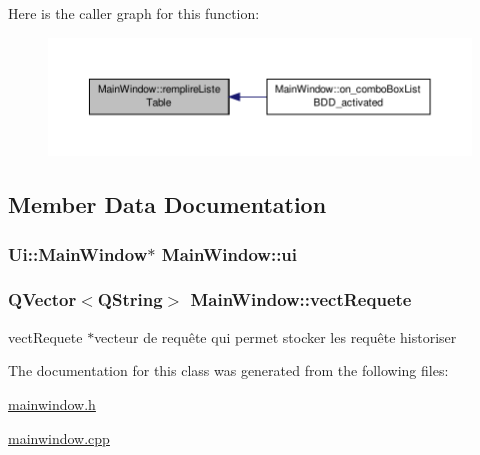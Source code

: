 Here is the caller graph for this function\-:\nopagebreak
\begin{figure}[H]
\begin{center}
\leavevmode
\includegraphics[width=350pt]{class_main_window_a1806a3496bae552b99a6c4e7e94c6b06_icgraph}
\end{center}
\end{figure}




\subsection{Member Data Documentation}
\hypertarget{class_main_window_a35466a70ed47252a0191168126a352a5}{
\subsubsection[{ui}]{\setlength{\rightskip}{0pt plus 5cm}Ui\-::\-Main\-Window$\ast$ Main\-Window\-::ui\hspace{0.3cm}{\ttfamily [private]}}}\label{class_main_window_a35466a70ed47252a0191168126a352a5}
\hypertarget{class_main_window_a5f49a678546840890fce99215d0d086c}{
\subsubsection[{vect\-Requete}]{\setlength{\rightskip}{0pt plus 5cm}Q\-Vector$<$Q\-String$>$ Main\-Window\-::vect\-Requete}}\label{class_main_window_a5f49a678546840890fce99215d0d086c}


vect\-Requete $\ast$vecteur de requête qui permet stocker les requête historiser 



The documentation for this class was generated from the following files\-:\begin{DoxyCompactItemize}
\item 
\hyperlink{mainwindow_8h}{mainwindow.\-h}\item 
\hyperlink{mainwindow_8cpp}{mainwindow.\-cpp}\end{DoxyCompactItemize}
